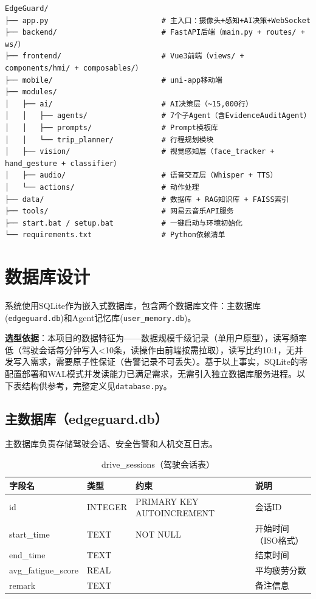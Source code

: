 \documentclass[a4paper]{article}
\begin{document}
\begin{lstlisting}[title=EdgeGuard项目目录结构（顶层概览）,frame=trbl]
EdgeGuard/
├── app.py                          # 主入口：摄像头+感知+AI决策+WebSocket
├── backend/                        # FastAPI后端（main.py + routes/ + ws/）
├── frontend/                       # Vue3前端（views/ + components/hmi/ + composables/）
├── mobile/                         # uni-app移动端
├── modules/
│   ├── ai/                         # AI决策层（~15,000行）
│   │   ├── agents/                 # 7个子Agent（含EvidenceAuditAgent）
│   │   ├── prompts/                # Prompt模板库
│   │   └── trip_planner/           # 行程规划模块
│   ├── vision/                     # 视觉感知层（face_tracker + hand_gesture + classifier）
│   ├── audio/                      # 语音交互层（Whisper + TTS）
│   └── actions/                    # 动作处理
├── data/                           # 数据库 + RAG知识库 + FAISS索引
├── tools/                          # 网易云音乐API服务
├── start.bat / setup.bat           # 一键启动与环境初始化
└── requirements.txt                # Python依赖清单
\end{lstlisting}

\section{数据库设计}

系统使用SQLite作为嵌入式数据库，包含两个数据库文件：主数据库(\texttt{edgeguard.db})和Agent记忆库(\texttt{user\_memory.db})。

\textbf{选型依据}：本项目的数据特征为——数据规模千级记录（单用户原型），读写频率低（驾驶会话每分钟写入<10条，读操作由前端按需拉取），读写比约10:1，无并发写入需求，需要原子性保证（告警记录不可丢失）。基于以上事实，SQLite的零配置部署和WAL模式并发读能力已满足需求，无需引入独立数据库服务进程。以下表结构供参考，完整定义见\texttt{database.py}。

\subsection{主数据库（edgeguard.db）}

主数据库负责存储驾驶会话、安全告警和人机交互日志。

\begin{table}[H]
  \centering
  \caption{drive\_sessions（驾驶会话表）}
  \label{tab:drive_sessions}
  \begin{tabular}{llll}
  \toprule
  字段名 & 类型 & 约束 & 说明 \\
  \midrule
  id & INTEGER & PRIMARY KEY AUTOINCREMENT & 会话ID \\
  start\_time & TEXT & NOT NULL & 开始时间（ISO格式）\\
  end\_time & TEXT &  & 结束时间 \\
  avg\_fatigue\_score & REAL &  & 平均疲劳分数 \\
  remark & TEXT &  & 备注信息 \\
  \bottomrule
  \end{tabular}
\end{table}
\end{document}
